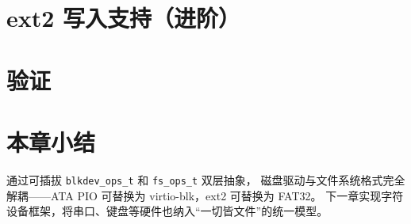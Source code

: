 
\section{ext2 写入支持（进阶）}
\label{sec:diskfs-ext2-rw}


\section{验证}
\label{sec:diskfs-verify}


\section{本章小结}

通过可插拔 \texttt{blkdev\_ops\_t} 和 \texttt{fs\_ops\_t} 双层抽象，
磁盘驱动与文件系统格式完全解耦——ATA PIO 可替换为 virtio-blk，ext2 可替换为 FAT32。
下一章实现字符设备框架，将串口、键盘等硬件也纳入``一切皆文件''的统一模型。
